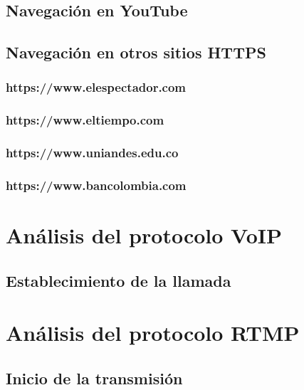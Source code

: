 \documentclass[10pt]{article}
\begin{document}
\subsection{Navegación en YouTube}
\subsection{Navegación en otros sitios HTTPS}
\subsubsection{https://www.elespectador.com}
\subsubsection{https://www.eltiempo.com}
\subsubsection{https://www.uniandes.edu.co}
\subsubsection{https://www.bancolombia.com}


\renewcommand{\thesection}{8.\arabic{section}}
\setcounter{section}{0}
\section{Análisis del protocolo VoIP}
\subsection{Establecimiento de la llamada}


\renewcommand{\thesection}{8.\arabic{section}}
\setcounter{section}{0}
\section{Análisis del protocolo RTMP}
\subsection{Inicio de la transmisión}
\end{document}
